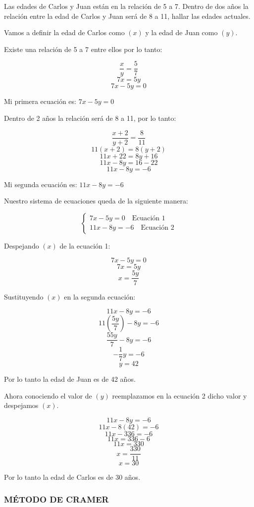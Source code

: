 \documentclass[12pt,a4paper]{article}
\begin{document}
Las edades de Carlos y Juan están en la relación de 5 a 7. Dentro de dos años la relación entre la edad de Carlos y Juan será de 8 a 11, hallar las edades actuales.

Vamos a definir la edad de Carlos como $(x)$ y la edad de Juan como $(y)$.

Existe una relación de 5 a 7 entre ellos por lo tanto:

\[ \frac{x}{y} = \frac{5}{7} \]
\[ 7x = 5y \]
\[ 7x - 5y = 0 \]

Mi primera ecuación es: $7x - 5y = 0$

Dentro de 2 años la relación será de 8 a 11, por lo tanto:

\[ \frac{x + 2}{y + 2} = \frac{8}{11} \]
\[ 11(x + 2) = 8(y + 2) \]
\[ 11x + 22 = 8y + 16 \]
\[ 11x - 8y = 16 - 22 \]
\[ 11x - 8y = -6 \]

Mi segunda ecuación es: $11x - 8y = -6$

Nuestro sistema de ecuaciones queda de la siguiente manera:

\[ \begin{cases}
7x - 5y = 0 \quad \text{Ecuación 1} \\
11x - 8y = -6 \quad \text{Ecuación 2}
\end{cases} \]

Despejando $(x)$ de la ecuación 1:

\[ 7x - 5y = 0 \]
\[ 7x = 5y \]
\[ x = \frac{5y}{7} \]

Sustituyendo $(x)$ en la segunda ecuación:

\[ 11x - 8y = -6 \]
\[ 11\left(\frac{5y}{7}\right) - 8y = -6 \]
\[ \frac{55y}{7} - 8y = -6 \]
\[ -\frac{1}{7}y = -6 \]
\[ y = 42 \]

Por lo tanto la edad de Juan es de 42 años.

Ahora conociendo el valor de $(y)$ reemplazamos en la ecuación 2 dicho valor y despejamos $(x)$.

\[ 11x - 8y = -6 \]
\[ 11x - 8(42) = -6 \]
\[ 11x - 336 = -6 \]
\[ 11x = 336 - 6 \]
\[ 11x = 330 \]
\[ x = \frac{330}{11} \]
\[ x = 30 \]

Por lo tanto la edad de Carlos es de 30 años.

\vspace{1cm}

\subsubsection*{MÉTODO DE CRAMER}
\end{document}
